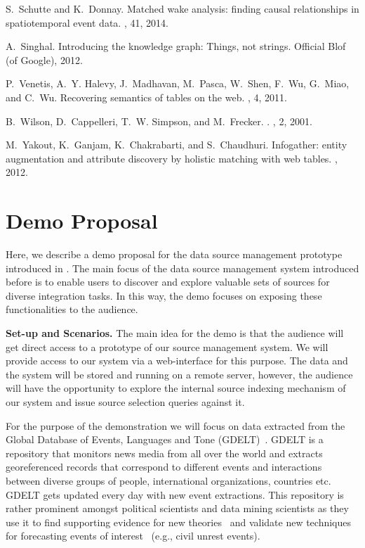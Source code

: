 \documentclass{sig-alternate}
\begin{document}
\begin{thebibliography}{10}
S.~Schutte and K.~Donnay.
\newblock Matched wake analysis: finding causal relationships in spatiotemporal
  event data.
, 41, 2014.

A.~Singhal.
\newblock Introducing the knowledge graph: Things, not strings.
\newblock Official Blof (of Google), 2012.

P.~Venetis, A.~Y. Halevy, J.~Madhavan, M.~Pasca, W.~Shen, F.~Wu, G.~Miao, and
  C.~Wu.
\newblock Recovering semantics of tables on the web.
, 4, 2011.

B.~Wilson, D.~Cappelleri, T.~W. Simpson, and M.~Frecker.
.
, 2, 2001.

M.~Yakout, K.~Ganjam, K.~Chakrabarti, and S.~Chaudhuri.
\newblock Infogather: entity augmentation and attribute discovery by holistic
  matching with web tables.
, 2012.

\end{thebibliography}

\appendix
\section{Demo Proposal}
Here, we describe a demo proposal for the data source management prototype introduced in . The main focus of the data source management system introduced before is to enable users to discover and explore valuable sets of sources for diverse integration tasks. In this way, the demo focuses on exposing these functionalities to the audience. 

\vspace{3pt}\noindent\textbf{Set-up and Scenarios.} The main idea for the demo is that the audience will get direct access to a prototype of our source management system. We will provide access to our system via a web-interface for this purpose. The data and the system will be stored and running on a remote server, however, the audience will have the opportunity to explore the internal source indexing mechanism of our system and issue source selection queries against it. 

For the purpose of the demonstration we will focus on data extracted from the Global Database of Events, Languages and Tone (GDELT)~\cite{leetaru_ap:2013}. GDELT is a repository that monitors news media from all over the world and extracts georeferenced records that correspond to different events and interactions between diverse groups of people, international organizations, countries etc. GDELT gets updated every day with new event extractions. This repository is rather prominent amongst political scientists and data mining scientists as they use it to find supporting evidence for new theories~\cite{schutte_ap:2014} and validate new techniques for forecasting events of interest~\cite{keneshloo_ap:2014} (e.g., civil unrest events). 
\end{document}

